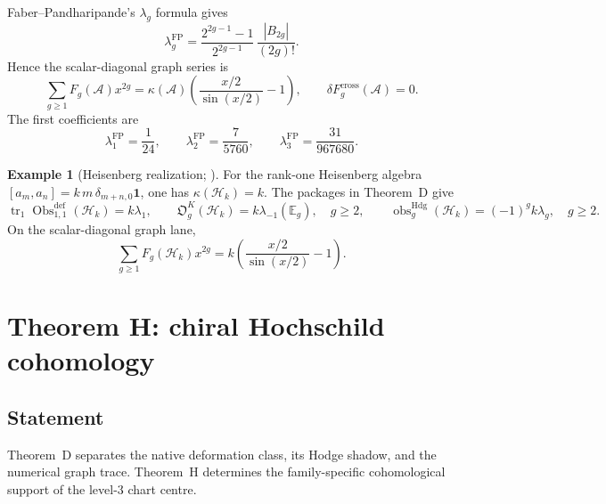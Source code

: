 \documentclass[11pt]{article}
\theoremstyle{plain}
\theoremstyle{definition}
\newtheorem{example}[theorem]{Example}
\theoremstyle{remark}
\newcommand{\cA}{\mathcal{A}}
\newcommand{\cH}{\mathcal{H}}
\begin{document}
Faber--Pandharipande's $\lambda_g$ formula
\cite[Section~0.2]{FP03} gives
\[
 \lambda_g^{\mathrm{FP}}
 =\frac{2^{2g-1}-1}{2^{2g-1}}\,
  \frac{|B_{2g}|}{(2g)!}.
\]
Hence the scalar-diagonal graph series is
\begin{equation}\label{eq:ahat-generating}
 \sum_{g\ge1}F_g(\cA)x^{2g}
 =\kappa(\cA)
  \left(\frac{x/2}{\sin(x/2)}-1\right),
 \qquad
 \delta F_g^{\mathrm{cross}}(\cA)=0.
\end{equation}
The first coefficients are
\[
 \lambda_1^{\mathrm{FP}}=\frac1{24},
 \qquad
 \lambda_2^{\mathrm{FP}}=\frac7{5760},
 \qquad
 \lambda_3^{\mathrm{FP}}=\frac{31}{967680}.
\]

\begin{example}[Heisenberg realization;
\ClaimStatusConditional]
\label{ex:thmD-heis}
For the rank-one Heisenberg algebra
\([a_m,a_n]=k\,m\,\delta_{m+n,0}\mathbf1\), one has
\(\kappa(\cH_k)=k\).  The packages in Theorem~D give
\[
 \operatorname{tr}_1
 \operatorname{Obs}^{\mathrm{def}}_{1,1}(\cH_k)=k\lambda_1,
 \qquad
 \mathfrak O_g^K(\cH_k)=k\lambda_{-1}(\mathbb E_g),\quad g\ge2,
 \qquad
 \operatorname{obs}^{\mathrm{Hdg}}_g(\cH_k)=(-1)^gk\lambda_g,\quad g\ge2.
\]
On the scalar-diagonal graph lane,
\[
 \sum_{g\ge1}F_g(\cH_k)x^{2g}
 =k\left(\frac{x/2}{\sin(x/2)}-1\right).
\]
\end{example}


\section{Theorem H: chiral Hochschild cohomology}
\label{sec:theorem-H}

\subsection{Statement}

Theorem~D separates the native deformation class, its Hodge shadow,
and the numerical graph trace.  Theorem~H determines the
family-specific cohomological support of the level-$3$ chart centre.
\end{document}
